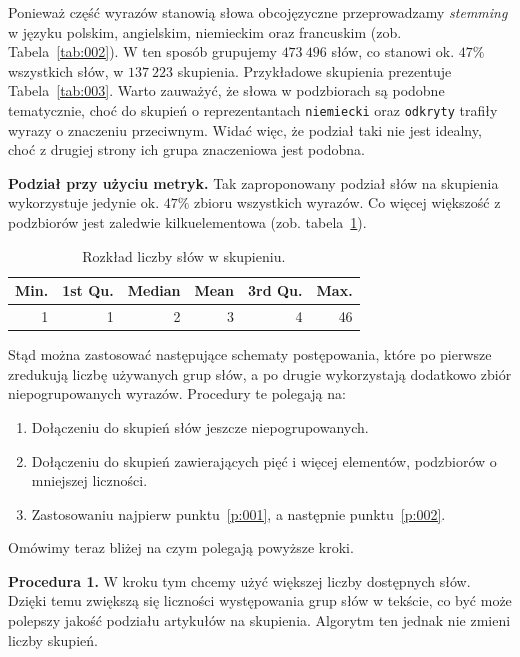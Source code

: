 \documentclass{praca1}
\begin{document}
Ponieważ część wyrazów stanowią słowa obcojęzyczne przeprowadzamy \emph{stemming} w języku polskim, angielskim, niemieckim oraz francuskim (zob. Tabela~\ref{tab:002}). W ten sposób grupujemy $473\ 496$ słów, co stanowi ok. $47\%$ wszystkich słów, w $137\ 223$ skupienia. Przykładowe skupienia prezentuje Tabela~\ref{tab:003}. Warto zauważyć, że słowa w podzbiorach są podobne tematycznie, choć do skupień o reprezentantach \verb|niemiecki| oraz \verb|odkryty| trafiły wyrazy o znaczeniu przeciwnym. Widać więc, że podział taki nie jest idealny, choć z drugiej strony ich grupa znaczeniowa jest podobna.

\textbf{Podział przy użyciu metryk.}
Tak zaproponowany podział słów na skupienia wykorzystuje jedynie ok. $47\%$ zbioru wszystkich wyrazów. Co więcej większość z podzbiorów jest zaledwie kilkuelementowa (zob. tabela~\ref{tab:004}). 

\begin{table}[!h]
\centering
\caption{Rozkład liczby słów w skupieniu.}
\begin{tabular}{|r|r|r|r|r|r|}
  \hline
Min. & 1st Qu. & Median & Mean & 3rd Qu. & Max. \\ 
  \hline
1 & 1 & 2 & 3 & 4 & 46 \\ 
   \hline
\end{tabular}
\label{tab:004}
\end{table}


Stąd można zastosować następujące schematy postępowania, które po pierwsze zredukują liczbę używanych grup słów, a po drugie wykorzystają dodatkowo zbiór niepogrupowanych wyrazów. Procedury te polegają na:
\begin{enumerate}
\item\label{p:001} Dołączeniu do skupień słów jeszcze niepogrupowanych.
\item\label{p:002} Dołączeniu do skupień zawierających pięć i więcej elementów, podzbiorów o mniejszej liczności.
\item Zastosowaniu najpierw punktu~\ref{p:001}, a następnie punktu~\ref{p:002}.
\end{enumerate}

Omówimy teraz bliżej na czym polegają powyższe kroki.

\textbf{Procedura 1.} W kroku tym chcemy użyć większej liczby dostępnych słów. Dzięki temu zwiększą się liczności występowania grup słów w tekście, co być może polepszy jakość podziału artykułów na skupienia. Algorytm ten jednak nie zmieni liczby skupień. 
\end{document}
